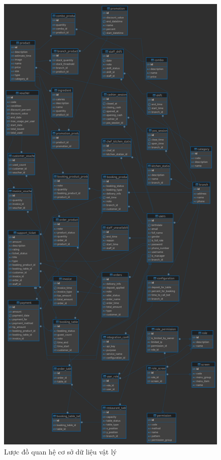 \begin{figure}[H]
    \centering
    \includegraphics[height=0.9\textheight]{Images/ldqh.png}
    \vspace{0.5cm}
    \caption{Lược đồ quan hệ cơ sở dữ liệu vật lý}
    \label{fig:logical_schema}
\end{figure}